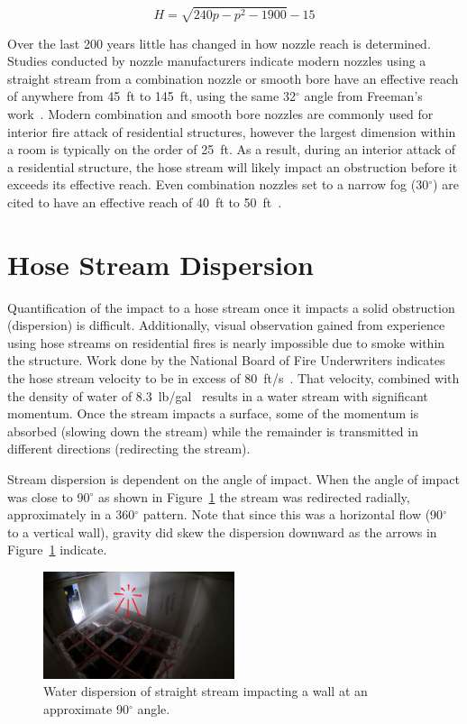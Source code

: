 \documentclass[12pt,oneside]{book}
\begin{document}
\begin{equation*}
	H = \sqrt{240p - p^2 - 1900} -15
\end{equation*}

Over the last 200 years little has changed in how nozzle reach is determined. Studies conducted by nozzle manufacturers indicate modern nozzles using a straight stream from a combination nozzle or smooth bore have an effective reach of anywhere from 45~ft to 145~ft, using the same 32$^\circ$ angle from Freeman's work~\cite{TFT_Reach,Elkhart_Reach,Akron_Reach}. Modern combination and smooth bore nozzles are commonly used for interior fire attack of residential structures, however the largest dimension within a room is typically on the order of 25~ft. As a result, during an interior attack of a residential structure, the hose stream will likely impact an obstruction before it exceeds its effective reach. Even combination nozzles set to a narrow fog (30$^\circ$) are cited to have an effective reach of 40~ft to 50~ft~\cite{Elkhart_Reach}.

\section{Hose Stream Dispersion}
\label{sec:dispersion}
Quantification of the impact to a hose stream once it impacts a solid obstruction (dispersion) is difficult. Additionally, visual observation gained from experience using hose streams on residential fires is nearly impossible due to smoke within the structure. Work done by the National Board of Fire Underwriters indicates the hose stream velocity to be in excess of 80~ft/s~\cite{NBFU:EffectiveReach}. That velocity, combined with the density of water of 8.3~lb/gal~\cite{SFPEHandbookPurser} results in a water stream with significant momentum. Once the stream impacts a surface, some of the momentum is absorbed (slowing down the stream) while the remainder is transmitted in different directions (redirecting the stream). 

Stream dispersion is dependent on the angle of impact. When the angle of impact was close to 90$^{\circ}$ as shown in Figure~\ref{fig:90DegreeImpact} the stream was redirected radially, approximately in a 360$^{\circ}$ pattern. Note that since this was a horizontal flow (90$^{\circ}$ to a vertical wall), gravity did skew the dispersion downward as the arrows in Figure~\ref{fig:90DegreeImpact} indicate.  

\begin{figure}[!ht]
\centering
\includegraphics[width=0.5\textwidth]{Figures/Water_Distribution/Nozzle_Directions/Exterior_AtWall_SB_Arrows}
\caption[Water Dispersion Straight Stream 90$^{\circ}$ Impact Angle]{Water dispersion of straight stream impacting a wall at an approximate 90$^{\circ}$ angle.}
\label{fig:90DegreeImpact}
\end{figure}
\end{document}
